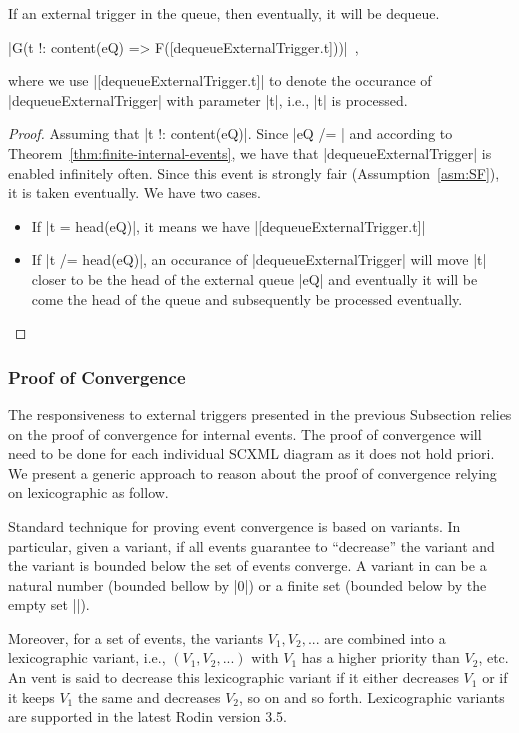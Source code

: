 \begin{theorem}
  If an external trigger in the queue, then eventually, it will be dequeue.
  \begin{center}
    |G(t !: content(eQ) => F([dequeueExternalTrigger.t]))|~,
  \end{center}
  where we use |[dequeueExternalTrigger.t]| to denote the occurance of
  |dequeueExternalTrigger| with parameter |t|, i.e., |t| is processed.
\end{theorem}
\begin{proof}
  Assuming that |t !: content(eQ)|. Since |eQ /= {}| and according to
  Theorem~\ref{thm:finite-internal-events}, we have that
  |dequeueExternalTrigger| is enabled infinitely often.  Since this
  event is strongly fair (Assumption~\ref{asm:SF}), it is taken
  eventually. We have two cases.
  \begin{itemize}
  \item If |t = head(eQ)|, it means we have
    |[dequeueExternalTrigger.t]|
    
  \item If |t /= head(eQ)|, an occurance of |dequeueExternalTrigger|
    will move |t| closer to be the head of the external queue |eQ| and
    eventually it will be come the head of the queue and subsequently
    be processed eventually.
  \end{itemize}
\end{proof}

\subsubsection{Proof of Convergence}
\label{sec:proof-convergence}
The responsiveness to external triggers presented in the previous
Subsection relies on the proof of convergence for internal events. The
proof of convergence will need to be done for each individual SCXML
diagram as it does not hold priori.  We present a generic approach to
reason about the proof of convergence relying on lexicographic as
follow.

Standard technique for proving event convergence is based on
variants.  In particular, given a variant, if all events guarantee to
``decrease'' the variant and the variant is bounded below the set of
events converge.  A variant in \EventB can be a natural number
(bounded bellow by |0|) or a finite set (bounded below by the empty
set |{}|).

Moreover, for a set of events, the variants $V_1, V_2, ...$ are combined into a
lexicographic variant, i.e., $(V_1, V_2, ...)$ with $V_1$ has a higher
priority than $V_2$, etc. An vent is said to decrease this
lexicographic variant if it either decreases $V_1$ or if it keeps
$V_1$ the same and decreases $V_2$, so on and so forth.  Lexicographic
variants are supported in the latest Rodin version 3.5.

